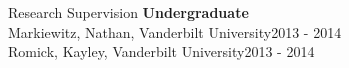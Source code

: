 \begin{rSection}{\textrm{Research Supervision}}
{\large \textbf{Undergraduate}}\\
Markiewitz, Nathan, Vanderbilt University\hfill{2013 - 2014}\smallskip\\
Romick, Kayley, Vanderbilt University\hfill{2013 - 2014}
\end{rSection}